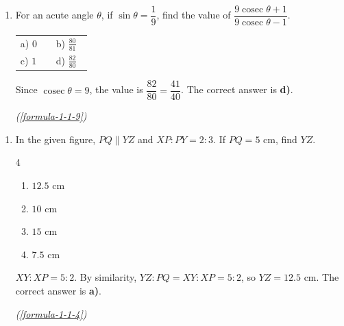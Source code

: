\vspace{1.2em}
\begin{enumerate}[label={},font=\normalfont,leftmargin=1.15cm,labelwidth=1.0cm,labelsep=0.15cm,itemindent=0pt,listparindent=0pt,parsep=0pt,topsep=0pt]
\item[5.1.14] For an acute angle $\theta$, if $\sin\theta=\dfrac{1}{9}$, find the value of $\dfrac{9\operatorname{cosec}\theta+1}{9\operatorname{cosec}\theta-1}$.

\begin{tabular}{@{}p{0.42\linewidth}p{0.42\linewidth}@{}}
a) $0$ & b) $\frac{80}{81}$\\
c) $1$ & d) $\frac{82}{80}$
\end{tabular}

\vspace{0.7em}\par\solution
 Since $\operatorname{cosec}\theta=9$, the value is $\dfrac{82}{80}=\dfrac{41}{40}$. The correct answer is \textbf{d)}.
\par\noindent\hfill\mbox{\textit{(\ref{formula-1-1-9})}}\par\end{enumerate}
\vspace{1.2em}
\begin{enumerate}[label={},font=\normalfont,leftmargin=1.15cm,labelwidth=1.0cm,labelsep=0.15cm,itemindent=0pt,listparindent=0pt,parsep=0pt,topsep=0pt]
\item[5.1.15] In the given figure, $PQ\parallel YZ$ and $XP:PY=2:3$. If $PQ=5$ cm, find $YZ$.
\par\nopagebreak[4]

\begin{multicols}{4}
\begin{enumerate}
\setlength{\itemsep}{0pt}
    \item $12.5$ cm
    \item $10$ cm
    \item $15$ cm
    \item $7.5$ cm
\end{enumerate}
\end{multicols}

\vspace{0.7em}\par\solution
 $XY:XP=5:2$. By similarity, $YZ:PQ=XY:XP=5:2$, so $YZ=12.5$ cm. The correct answer is \textbf{a)}.
\par\noindent\hfill\mbox{\textit{(\ref{formula-1-1-4})}}\par\end{enumerate}
